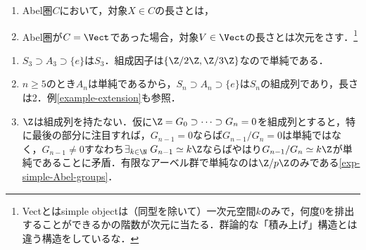 \documentclass[uplatex,dvipdfmx]{jsreport}
\begin{document}
\begin{definition}[length]\mbox{}
    \begin{enumerate}
        \item Abel圏$C$において，対象$X\in C$の長さとは，
        \item Abel圏が$C=\Vect$であった場合，対象$V\in\Vect$の長さとは次元をさす．\footnote{Vectとはsimple objectは（同型を除いて）一次元空間$k$のみで，何度$0$を排出することができるかの階数が次元に当たる．群論的な「積み上げ」構造とは違う構造をしているな．}
    \end{enumerate}
\end{definition}
\begin{example}\mbox{}\label{exp-composition-series}
    \begin{enumerate}
        \item $S_3\supset A_3\supset\{e\}$は$S_3$．組成因子は$\{\Z/2\Z,\Z/3\Z\}$なので単純である．
        \item $n\ge 5$のとき$A_n$は単純であるから，$S_n\supset A_n\supset\{e\}$は$S_n$の組成列であり，長さは2．例\ref{example-extension}も参照．
        \item $\Z$は組成列を持たない．仮に$\Z=G_0\supset\cdots\supset G_n=0$を組成列とすると，特に最後の部分に注目すれば，$G_{n-1}=0$ならば$G_{n-1}/G_n=0$は単純ではなく，$G_{n-1}\ne 0$すなわち$\exists_{k\in\N}\;G_{n-1}\simeq k\Z$ならばやはり$G_{n-1}/G_n\simeq k\Z$が単純であることに矛盾．有限なアーベル群で単純なのは$\Z/p\Z$のみである\ref{exp-simple-Abel-groups}．
    \end{enumerate}
\end{example}
\end{document}
